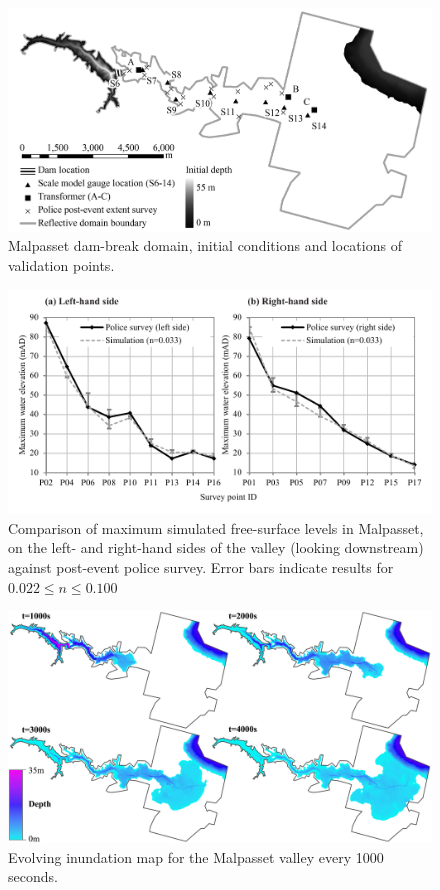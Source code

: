 \begin{figure}[tpb]
\centering
\includegraphics[width=1.0\textwidth]{heterogeneous-dev-figures/Figure_8_Greyscale.jpg}
\caption{Malpasset dam-break domain, initial conditions and locations of validation points.}
\label{MalpassetIntro}
\end{figure}
\begin{figure}[tpb]
\centering
\includegraphics[width=1.0\textwidth]{heterogeneous-dev-figures/Figure_10_Greyscale.pdf}
\caption{Comparison of maximum simulated free-surface levels in Malpasset, on the left- and right-hand sides of the valley (looking downstream) against post-event police survey. Error bars indicate results for $0.022 \le n \le 0.100$ }
\label{MalpassetValidation}
\end{figure}
\begin{figure}[tpb]
\centering
\includegraphics[width=1.0\textwidth]{heterogeneous-dev-figures/Figure_9_Colour.jpg}
\caption{Evolving inundation map for the Malpasset valley every 1000 seconds.}
\label{MalpassetProgression}
\end{figure}

